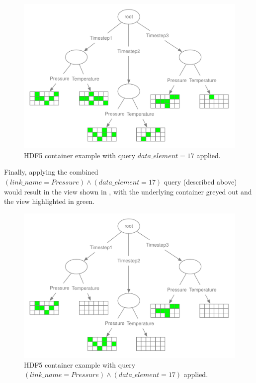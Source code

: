 \documentclass[letterpaper,hyper]{THG_RFC}
\begin{document}
\begin{figure}
\includegraphics[width=\mediumfigwidth]{HDF5File-Checkpoint-View2}
\caption{HDF5 container example with query $data\_element = 17$ applied.}
\label{fig:HDF5File-Checkpoint-View2}
\end{figure}

Finally, applying the combined $(link\_name = Pressure)\land(data\_element = 17)$
query (described above) would result in the view shown in
, with the underlying container
greyed out and the view highlighted in green.

\begin{figure}
\includegraphics[width=\mediumfigwidth]{HDF5File-Checkpoint-View3}
\caption{HDF5 container example with query $(link\_name = Pressure)\land(data\_element = 17)$ applied.}
\label{fig:HDF5File-Checkpoint-View3}
\end{figure}
\end{document}
